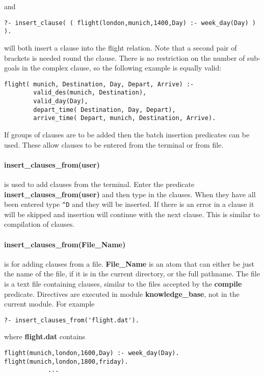 and

\begin{verbatim} 
?- insert_clause( ( flight(london,munich,1400,Day) :- week_day(Day) ) ).
\end{verbatim}

will both insert a clause into the flight relation. Note that a second pair of
brackets is needed round the clause.  There is no restriction
on the number of sub-goals in the complex clause, so the following 
example is equally valid:

\begin{verbatim}
flight( munich, Destination, Day, Depart, Arrive) :-
        valid_des(munich, Destination),
        valid_day(Day),
        depart_time( Destination, Day, Depart),
        arrive_time( Depart, munich, Destination, Arrive).
\end{verbatim}


If groups of clauses are to be added then the batch insertion predicates
can be used.  These allow clauses to be entered from the terminal
or from file. 

\paragraph{insert\_clauses\_from(user)}
is used to add clauses from the terminal. Enter the predicate 
{\bf insert\_clauses\_from(user)} and then type in 
the clauses.  When they have all been entered type \verb+^D+
and they will be inserted.  If there is an error in a
clause it will be skipped and insertion will continue with
the next clause. This is similar to compilation of clauses.

\paragraph{insert\_clauses\_from(File\_Name)} 
is for adding clauses from a file.  {\bf File\_Name} is
an atom that can either be just the name of the file,
if it is in the current directory, or the full pathname.
The file is a text file containing clauses, similar to the files
accepted by the {\bf compile} predicate. Directives are
executed in module {\bf knowledge_base}, not in the current module.
For example
\begin{verbatim}
?- insert_clauses_from('flight.dat').
\end{verbatim}

where {\bf flight.dat} contains

\begin{verbatim}
flight(munich,london,1600,Day) :- week_day(Day).
flight(munich,london,1800,friday).
            ...
\end{verbatim}

